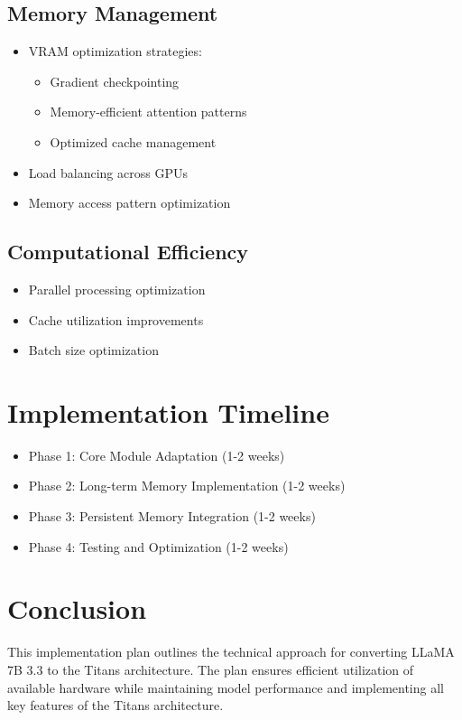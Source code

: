 \documentclass{article}
\begin{document}
\subsection{Memory Management}
\begin{itemize}
    \item VRAM optimization strategies:
    \begin{itemize}
        \item Gradient checkpointing
        \item Memory-efficient attention patterns
        \item Optimized cache management
    \end{itemize}
    \item Load balancing across GPUs
    \item Memory access pattern optimization
\end{itemize}

\subsection{Computational Efficiency}
\begin{itemize}
    \item Parallel processing optimization
    \item Cache utilization improvements
    \item Batch size optimization
\end{itemize}

\section{Implementation Timeline}
\begin{itemize}
    \item Phase 1: Core Module Adaptation (1-2 weeks)
    \item Phase 2: Long-term Memory Implementation (1-2 weeks)
    \item Phase 3: Persistent Memory Integration (1-2 weeks)
    \item Phase 4: Testing and Optimization (1-2 weeks)
\end{itemize}

\section{Conclusion}
This implementation plan outlines the technical approach for converting LLaMA 7B 3.3 to the Titans architecture. The plan ensures efficient utilization of available hardware while maintaining model performance and implementing all key features of the Titans architecture.
\end{document}
